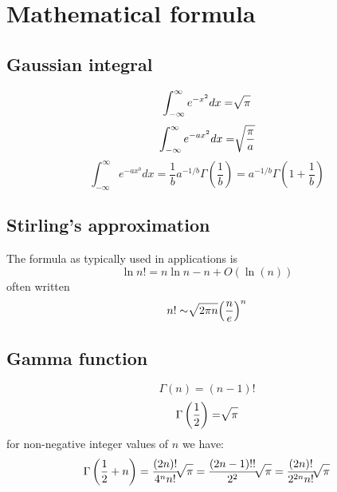 %
%
%
%
%
\section{Mathematical formula}
\subsection{Gaussian integral}
\[ \int_{-\infty }^{\infty } e^{-x^2} dx = \sqrt[  ]{\mathstrut \pi } \]
\[ \int_{-\infty }^{\infty } e^{-ax^2} dx = \sqrt[  ]{\mathstrut \frac{ \pi }{ a } } \]
\[ \int_{-\infty }^{\infty } e^{-ax^b} dx = \frac{1}{b} a^{-1/b} \Gamma \left( \frac{1}{b} \right) = a^{-1/b} \Gamma \left( 1 + \frac{1}{b} \right) \]

\subsection{Stirling's approximation}
The formula as typically used in applications is
\[ \ln n! = n\ln n - n + O\left( \ln \left( n \right) \right) \]
often written
\[ n! \sim \sqrt[  ]{\mathstrut 2\pi n} {\left( \frac{n}{e} \right)}^n \]

\subsection{Gamma function}
\[ \Gamma \left( n \right) = \left( n -1 \right) ! \]
\[ \Gamma \left( \frac{1}{2} \right) = \sqrt[  ]{\mathstrut \pi } \]
for non-negative integer values of $n$ we have:
\[ \Gamma \left( \frac{1}{2} +n \right) = \frac{ \left( 2n \right) !}{ 4^n n! }\sqrt[  ]{\mathstrut \pi } = \frac{ \left( 2n-1 \right) !! }{ 2^2 } \sqrt[  ]{\mathstrut \pi } = \frac{\left( 2n \right) !}{2^{2n} n!} \sqrt[  ]{\mathstrut \pi }\]

